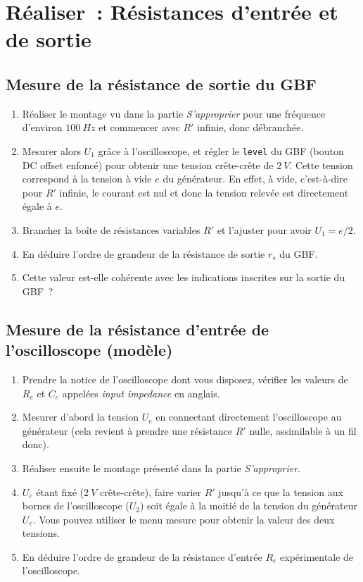 \documentclass[../main/main.tex]{subfiles}
\begin{document}
\section{Réaliser~: Résistances d'entrée et de sortie}
\subsection{Mesure de la résistance de sortie du GBF}

\begin{enumerate}
	\item Réaliser le montage vu dans la partie \textit{S'approprier} pour une
	      fréquence d'environ $\SI{100}{Hz}$ et commencer avec $R'$ infinie, donc
	      débranchée.
	\item Mesurer alors $U_1$ grâce à l'oscilloscope, et régler le
	      \texttt{level} du GBF (bouton DC offset enfoncé) pour obtenir une
	      tension crête-crête de $\SI{2}{V}$. Cette tension correspond à la
	      tension à vide $e$ du générateur. En effet, à vide, c'est-à-dire pour
	      $R'$ infinie, le courant est nul et donc la tension relevée est
	      directement égale à $e$.
	\item Brancher la boîte de résistances variables $R'$ et l'ajuster pour
	      avoir $U_1 = e/2$.
	\item En déduire l'ordre de grandeur de la résistance de sortie $r_{s}$ du
	      GBF.
	\item Cette valeur est-elle cohérente avec les indications inscrites sur la
	      sortie du GBF~?
\end{enumerate}

\vspace{-0.6cm}

\subsection{Mesure de la résistance d'entrée de l'oscilloscope (modèle)}

\begin{enumerate}
	\item Prendre la notice de l'oscilloscope dont vous disposez, vérifier les
	      valeurs de $R_{e}$ et $C_{e}$ appelées \textit{input impedance} en
	      anglais.
	\item Mesurer d'abord la tension $U_{e}$ en connectant directement
	      l'oscilloscope au générateur (cela revient à prendre une résistance $R'$
	      nulle, assimilable à un fil donc).
	\item Réaliser ensuite le montage présenté dans la partie
	      \textit{S'approprier}.
	\item $U_{e}$ étant fixé ($\SI{2}{V}$ crête-crête), faire varier $R'$
	      jusqu'à ce que la tension aux bornes de l'oscilloscope ($U_2$) soit
	      égale à la moitié de la tension du générateur $U_{e}$. Vous pouvez
	      utiliser le menu mesure pour obtenir la valeur des deux tensions.
	\item En déduire l'ordre de grandeur de la résistance d'entrée $R_{e}$
	      expérimentale de l'oscilloscope.
\end{enumerate}
\end{document}

